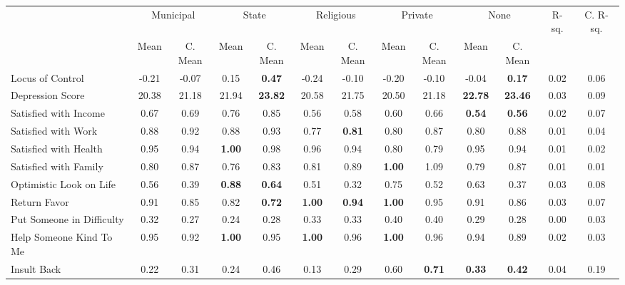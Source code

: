 \begin{tabular}{l c c c c c c c c c c c c}
\toprule
& \multicolumn{2}{c}{Municipal} & \multicolumn{2}{c}{State} & \multicolumn{2}{c}{Religious} & \multicolumn{2}{c}{Private} & \multicolumn{2}{c}{None} & R-sq. & C. R-sq. \\
& \scriptsize Mean & \scriptsize C. Mean & \scriptsize Mean & \scriptsize C. Mean & \scriptsize Mean & \scriptsize C. Mean & \scriptsize Mean & \scriptsize C. Mean & \scriptsize Mean & \scriptsize C. Mean & & \\
\midrule
Locus of Control &     -0.21 & -0.07 &      0.15 & \textbf{     0.47} &     -0.24 & -0.10 &     -0.20 & -0.10 &     -0.04 & \textbf{     0.17} &      0.02 &      0.06 \\
Depression Score &     20.38 & 21.18 &     21.94 & \textbf{    23.82} &     20.58 & 21.75 &     20.50 & 21.18 & \textbf{    22.78} & \textbf{    23.46} &      0.03 &      0.09 \\
Satisfied with Income &      0.67 & 0.69 &      0.76 & 0.85 &      0.56 & 0.58 &      0.60 & 0.66 & \textbf{     0.54} & \textbf{     0.56} &      0.02 &      0.07 \\
Satisfied with Work &      0.88 & 0.92 &      0.88 & 0.93 &      0.77 & \textbf{     0.81} &      0.80 & 0.87 &      0.80 & 0.88 &      0.01 &      0.04 \\
Satisfied with Health &      0.95 & 0.94 & \textbf{     1.00} & 0.98 &      0.96 & 0.94 &      0.80 & 0.79 &      0.95 & 0.94 &      0.01 &      0.02 \\
Satisfied with Family &      0.80 & 0.87 &      0.76 & 0.83 &      0.81 & 0.89 & \textbf{     1.00} & 1.09 &      0.79 & 0.87 &      0.01 &      0.01 \\
Optimistic Look on Life &      0.56 & 0.39 & \textbf{     0.88} & \textbf{     0.64} &      0.51 & 0.32 &      0.75 & 0.52 &      0.63 & 0.37 &      0.03 &      0.08 \\
Return Favor &      0.91 & 0.85 &      0.82 & \textbf{     0.72} & \textbf{     1.00} & \textbf{     0.94} & \textbf{     1.00} & 0.95 &      0.91 & 0.86 &      0.03 &      0.07 \\
Put Someone in Difficulty &      0.32 & 0.27 &      0.24 & 0.28 &      0.33 & 0.33 &      0.40 & 0.40 &      0.29 & 0.28 &      0.00 &      0.03 \\
Help Someone Kind To Me &      0.95 & 0.92 & \textbf{     1.00} & 0.95 & \textbf{     1.00} & 0.96 & \textbf{     1.00} & 0.96 &      0.94 & 0.89 &      0.02 &      0.03 \\
Insult Back &      0.22 & 0.31 &      0.24 & 0.46 &      0.13 & 0.29 &      0.60 & \textbf{     0.71} & \textbf{     0.33} & \textbf{     0.42} &      0.04 &      0.19 \\
\bottomrule
\end{tabular}
